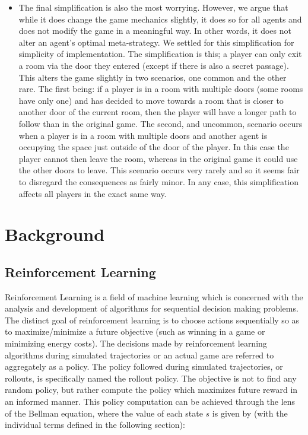 \documentclass[msc, ai, twoside, notimes, logo, parskip, leftchapter, normalheadings]{infthesis}
\begin{document}
\begin{itemize}
\item The final simplification is also the most worrying. However, we argue that while it does change the game mechanics slightly, it does so for all agents and does not modify the game in a meaningful way. In other words, it does not alter an agent's optimal meta-strategy. We settled for this simplification for simplicity of implementation. The simplification is this; a player can only exit a room via the door they entered (except if there is also a secret passage). This alters the game slightly in two scenarios, one common and the other rare. The first being: if a player is in a room with multiple doors (some rooms have only one) and has decided to move towards a room that is closer to another door of the current room, then the player will have a longer path to follow than in the original game. The second, and uncommon, scenario occurs when a player is in a room with multiple doors and another agent is occupying the space just outside of the door of the player. In this case the player cannot then leave the room, whereas in the original game it could use the other doors to leave. This scenario occurs very rarely and so it seems fair to disregard the consequences as fairly minor. In any case, this simplification affects all players in the exact same way.
\end{itemize}

\chapter{Background}
\section{Reinforcement Learning}
Reinforcement Learning is a field of machine learning which is concerned with the analysis and development of algorithms for sequential decision making problems. The distinct goal of reinforcement learning is to choose actions sequentially so as to maximize/minimize a future objective (such as winning in a game or minimizing energy costs). The decisions made by reinforcement learning algorithms during simulated trajectories or an actual game are referred to aggregately as a policy. The policy followed during simulated trajectories, or rollouts, is specifically named the rollout policy. The objective is not to find any random policy, but rather compute the policy which maximizes future reward in an informed manner. This policy computation can be achieved through the lens of the Bellman equation, where the value of each state \(s\) is given by (with the individual terms defined in the following section):
\end{document}
